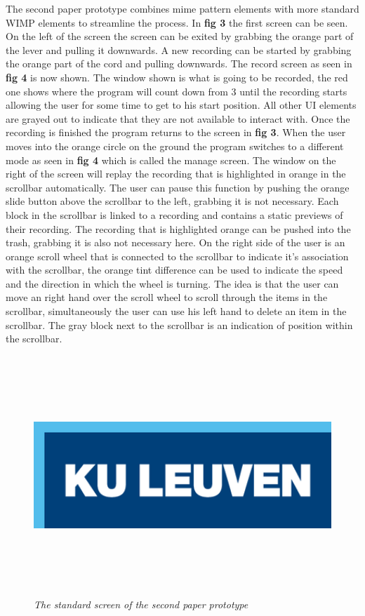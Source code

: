 The second paper prototype combines mime pattern elements with more standard WIMP elements to streamline the process. In \textbf{ fig 3} the first screen can be seen. On the left of the screen the screen can be exited by grabbing the orange part of the lever and pulling it downwards. A new recording can be started by grabbing the orange part of the cord and pulling downwards. The record screen as seen in \textbf{ fig 4} is now shown. The window shown is what is going to be recorded, the red one shows where the program will count down from 3 until the recording starts allowing the user for some time to get to his start position. All other UI elements are grayed out to indicate that they are not available to interact with. Once the recording is finished the program returns to the screen in \textbf{ fig 3}. When the user moves into the orange circle on the ground the program switches to a different mode as seen in \textbf{ fig 4} which is called the manage screen. The window on the right of the screen will replay the recording that is highlighted in orange in the scrollbar automatically. The user can pause this function by pushing the orange slide button above the scrollbar to the left, grabbing it is not necessary. Each block in the scrollbar is linked to a recording and contains a static previews of their recording. The recording that is highlighted orange can be pushed into the trash, grabbing it is also not necessary here. On the right side of the user is an orange scroll wheel that is connected to the scrollbar to indicate it's association with the scrollbar, the orange tint difference can be used to indicate the speed and the direction in which the wheel is turning. The idea is that the user can move an right hand over the scroll wheel to scroll through the items in the scrollbar, simultaneously the user can use his left hand to delete an item in the scrollbar. The gray block next to the scrollbar is an indication of position within the scrollbar.

\begin{figure}[H]
	\begin{center}
		\includegraphics[width=16cm, height=9cm]{KUL.png}
		\caption{\emph{The standard screen of the second paper prototype}}
		\label{The standard screen of the second paper prototype}
	\end{center}
\end{figure}

